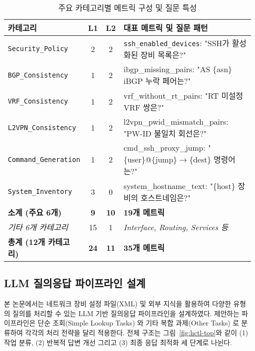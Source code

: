 \documentclass[twocolumn, 10pt]{article}
\begin{document}
\begin{table}[t]
\centering
\caption{주요 카테고리별 메트릭 구성 및 질문 특성}
\label{tab:category_details} \scriptsize
\begin{tabular}{p{2.4cm}|c|c|p{3.8cm}}
  \toprule 카테고리                      & L1          & L2          & 대표 메트릭 및 질문 패턴                                                        \\
  \midrule \texttt{Security\_Policy} & 2           & 2           & \texttt{ssh\_enabled\_devices}: "SSH가 활성화된 장비 목록은?"                   \\
  \texttt{BGP\_Consistency}          & 1           & 2           & ibgp\_missing\_pairs: "AS \{asn\} iBGP 누락 페어는?"                       \\
  \texttt{VRF\_Consistency}          & 1           & 2           & vrf\_without\_rt\_pairs: "RT 미설정 VRF 쌍은?"                             \\
  \texttt{L2VPN\_Consistency}        & 1           & 2           & l2vpn\_pwid\_mismatch\_pairs: "PW-ID 불일치 회선은?"                        \\
  \texttt{Command\_Generation}       & 1           & 2           & cmd\_ssh\_proxy\_jump: "\{user\}@\{jump\}$\rightarrow$\{dest\} 명령어는?" \\
  \texttt{System\_Inventory}         & 3           & 0           & system\_hostname\_text: "\{host\} 장비의 호스트네임은?"                        \\
  \midrule \textbf{소계 (주요 6개)}       & \textbf{9}  & \textbf{10} & \textbf{19개 메트릭}                                                      \\
  \textit{기타 6개 카테고리}                & 15          & 1           & \textit{Interface, Routing, Services 등}                               \\
  \midrule \textbf{총계 (12개 카테고리)}    & \textbf{24} & \textbf{11} & \textbf{35개 메트릭}                                                      \\
  \bottomrule
\end{tabular}
\end{table}

\subsection{LLM 질의응답 파이프라인 설계}
본 논문에서는 네트워크 장비 설정 파일(XML) 및 외부 지식을 활용하여 다양한 유형의
질의를 처리할 수 있는 LLM 기반 질의응답 파이프라인을 설계하였다. 제안하는
파이프라인은 단순 조회(Simple Lookup Tasks) 와 기타 복합 과제(Other Tasks) 로
분류하여 각각의 처리 전략을 달리 적용한다. 전체 구조는 그림~\ref{fig:hctl-top}와
같이 (1) 작업 분류, (2) 반복적 답변 개선 그리고 (3) 최종 응답 최적화 세 단계로
나뉜다.
\end{document}
